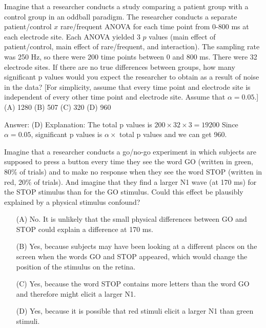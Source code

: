\documentclass[a4 paper]{article}
\begin{document}
\begin{tcolorbox}[colback=RubineRed!5!white,colframe=RubineRed!75!black]
Imagine that a researcher conducts a study comparing a patient group with a control group in an oddball paradigm. The researcher conducts a separate patient/control $x$ rare/frequent ANOVA for each time point from 0-800 ms at each electrode site. Each ANOVA yielded 3 $p$ values (main effect of patient/control, main effect of rare/frequent, and interaction). The sampling rate was 250 Hz, so there were 200 time points between 0 and 800 ms. There were 32 electrode sites. If there are no true differences between groups, how many significant p values would you expect the researcher to obtain as a result of noise in the data? [For simplicity, assume that every time point and electrode site is independent of every other time point and electrode site. Assume that $\alpha=0.05$.]\\
(A) 1280 (B) 507 (C) 320 (D) 960
\end{tcolorbox}
\begin{tcolorbox}[colback=YellowGreen!5!white,colframe=YellowGreen!75!black,title={Problem 8's answer}]
Answer: (D)\newline
Explanation:\newline
The total p values is $200\times 32 \times 3=19200$\newline
Since $\alpha=0.05$, significant p values is $\alpha\times$ total p values and we can get 960.
\end{tcolorbox}
\begin{tcolorbox}[colback=RubineRed!5!white,colframe=RubineRed!75!black]
Imagine that a researcher conducts a go/no-go experiment in which subjects are supposed to press a button every time they see the word GO (written in green, 80\% of trials) and to make no response when they see the word STOP (written in red, 20\% of trials). And imagine that they find a larger N1 wave (at 170 ms) for the STOP stimulus than for the GO stimulus. Could this effect be plausibly explained by a physical stimulus confound? 
\begin{itemize}
    \item[(A)]No. It is unlikely that the small physical differences between GO and STOP could explain a difference at 170 ms.
    \item[(B)]Yes, because subjects may have been looking at a different places on the screen when the words GO and STOP appeared, which would change the position of the stimulus on the retina.
    \item[(C)]Yes, because the word STOP contains more letters than the word GO and therefore might elicit a larger N1.
    \item[(D)] Yes, because it is possible that red stimuli elicit a larger N1 than green stimuli.
\end{itemize}
\end{tcolorbox}
\end{document}

